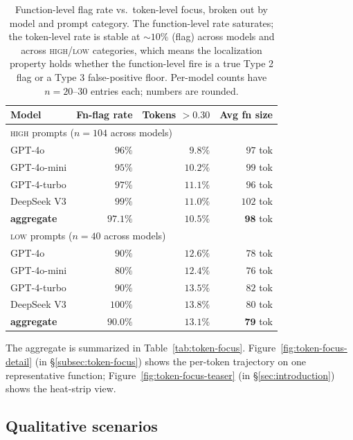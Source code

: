 \begin{table}[h]
\centering
\small
\begin{tabular}{l r r r}
\toprule
\textbf{Model} & \textbf{Fn-flag rate} & \textbf{Tokens $>0.30$}
 & \textbf{Avg fn size} \\
\midrule
\multicolumn{4}{l}{\textsc{high} prompts ($n=104$ across models)} \\
\midrule
GPT-4o        & $96\%$ & $9.8\%$  & $97$ tok \\
GPT-4o-mini   & $95\%$ & $10.2\%$ & $99$ tok \\
GPT-4-turbo   & $97\%$ & $11.1\%$ & $96$ tok \\
DeepSeek V3   & $99\%$ & $11.0\%$ & $102$ tok \\
\addlinespace
\textbf{aggregate} & $\mathbf{97.1\%}$ & $\mathbf{10.5\%}$
   & $\mathbf{98}$ tok \\
\midrule
\multicolumn{4}{l}{\textsc{low} prompts ($n=40$ across models)} \\
\midrule
GPT-4o        & $90\%$  & $12.6\%$ & $78$ tok \\
GPT-4o-mini   & $80\%$  & $12.4\%$ & $76$ tok \\
GPT-4-turbo   & $90\%$  & $13.5\%$ & $82$ tok \\
DeepSeek V3   & $100\%$ & $13.8\%$ & $80$ tok \\
\addlinespace
\textbf{aggregate} & $\mathbf{90.0\%}$ & $\mathbf{13.1\%}$
   & $\mathbf{79}$ tok \\
\bottomrule
\end{tabular}
\caption{Function-level flag rate vs.\ token-level focus, broken out
by model and prompt category. The function-level rate saturates; the
token-level rate is stable at $\sim 10\%$ (flag) across models and
across \textsc{high}/\textsc{low} categories, which means the
localization property holds whether the function-level fire is a
true Type 2 flag or a Type 3 false-positive floor. Per-model counts
have $n=20$--$30$ entries each; numbers are rounded.}
\label{tab:token-focus-per-model}
\end{table}

The aggregate is summarized in Table~\ref{tab:token-focus}.
Figure~\ref{fig:token-focus-detail} (in \S\ref{subsec:token-focus})
shows the per-token trajectory on one representative function;
Figure~\ref{fig:token-focus-teaser} (in \S\ref{sec:introduction})
shows the heat-strip view.

\subsection{Qualitative scenarios}
\label{subsec:scenarios}

